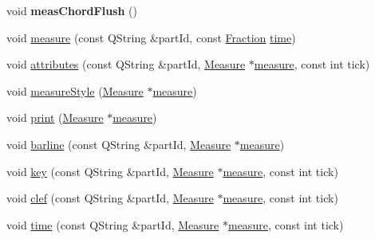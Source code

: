 \begin{DoxyCompactItemize}
\mbox{\label{class_ms_1_1_music_x_m_l_parser_pass2_a4d0584d9b8be541b7a33d9a9560e5e60}} 
void {\bfseries meas\+Chord\+Flush} ()
\item 
void \hyperlink{class_ms_1_1_music_x_m_l_parser_pass2_a0a37fd1f0a5c962fed1c843c00de07aa}{measure} (const Q\+String \&part\+Id, const \hyperlink{class_ms_1_1_fraction}{Fraction} \hyperlink{class_ms_1_1_music_x_m_l_parser_pass2_aa5c606224d78e25bbc87cf9683f6705f}{time})
\item 
void \hyperlink{class_ms_1_1_music_x_m_l_parser_pass2_adac6c4f2cd310507980dd7d57aa3c8e7}{attributes} (const Q\+String \&part\+Id, \hyperlink{class_ms_1_1_measure}{Measure} $\ast$\hyperlink{class_ms_1_1_music_x_m_l_parser_pass2_a0a37fd1f0a5c962fed1c843c00de07aa}{measure}, const int tick)
\item 
void \hyperlink{class_ms_1_1_music_x_m_l_parser_pass2_a68076147c3375916ebceb86db3c51456}{measure\+Style} (\hyperlink{class_ms_1_1_measure}{Measure} $\ast$\hyperlink{class_ms_1_1_music_x_m_l_parser_pass2_a0a37fd1f0a5c962fed1c843c00de07aa}{measure})
\item 
void \hyperlink{class_ms_1_1_music_x_m_l_parser_pass2_a2bbb76c80c200f8c49119cbcdaf48f7e}{print} (\hyperlink{class_ms_1_1_measure}{Measure} $\ast$\hyperlink{class_ms_1_1_music_x_m_l_parser_pass2_a0a37fd1f0a5c962fed1c843c00de07aa}{measure})
\item 
void \hyperlink{class_ms_1_1_music_x_m_l_parser_pass2_a90c030127af7225c2e0f3b51166cc0b8}{barline} (const Q\+String \&part\+Id, \hyperlink{class_ms_1_1_measure}{Measure} $\ast$\hyperlink{class_ms_1_1_music_x_m_l_parser_pass2_a0a37fd1f0a5c962fed1c843c00de07aa}{measure})
\item 
void \hyperlink{class_ms_1_1_music_x_m_l_parser_pass2_ad3b40065fafd611e568675bd30fed307}{key} (const Q\+String \&part\+Id, \hyperlink{class_ms_1_1_measure}{Measure} $\ast$\hyperlink{class_ms_1_1_music_x_m_l_parser_pass2_a0a37fd1f0a5c962fed1c843c00de07aa}{measure}, const int tick)
\item 
void \hyperlink{class_ms_1_1_music_x_m_l_parser_pass2_a4f419cca4f66e1c7a3ef9fc795e4d6e1}{clef} (const Q\+String \&part\+Id, \hyperlink{class_ms_1_1_measure}{Measure} $\ast$\hyperlink{class_ms_1_1_music_x_m_l_parser_pass2_a0a37fd1f0a5c962fed1c843c00de07aa}{measure}, const int tick)
\item 
void \hyperlink{class_ms_1_1_music_x_m_l_parser_pass2_aa5c606224d78e25bbc87cf9683f6705f}{time} (const Q\+String \&part\+Id, \hyperlink{class_ms_1_1_measure}{Measure} $\ast$\hyperlink{class_ms_1_1_music_x_m_l_parser_pass2_a0a37fd1f0a5c962fed1c843c00de07aa}{measure}, const int tick)

\end{DoxyCompactItemize}
